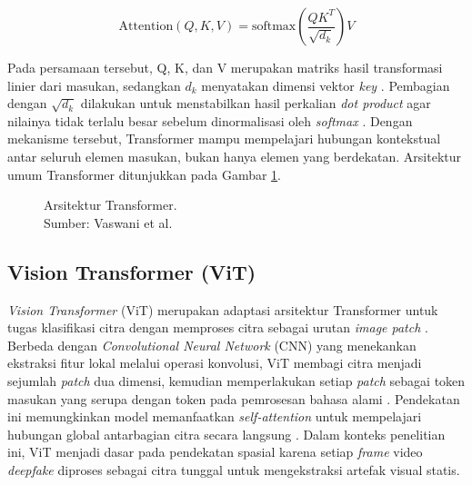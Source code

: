 \vspace{0.6\baselineskip}
\begingroup
\begin{equation}
\mathrm{Attention}(Q, K, V) = \mathrm{softmax}\left(\frac{QK^{T}}{\sqrt{d_k}}\right)V
\label{eq:self-attention}
\end{equation}
\endgroup
\vspace{0.6\baselineskip}

Pada persamaan tersebut, Q, K, dan V merupakan matriks hasil transformasi linier dari masukan, sedangkan $d_k$ menyatakan dimensi vektor \textit{key} \cite{vaswani2023attentionneed}. Pembagian dengan $\sqrt{d_k}$ dilakukan untuk menstabilkan hasil perkalian \textit{dot product} agar nilainya tidak terlalu besar sebelum dinormalisasi oleh \textit{softmax} \cite{vaswani2023attentionneed}. Dengan mekanisme tersebut, Transformer mampu mempelajari hubungan kontekstual antar seluruh elemen masukan, bukan hanya elemen yang berdekatan. Arsitektur umum Transformer ditunjukkan pada Gambar \ref{fig:arsitektur-transformer}. \par

\begin{figure}[htbp]
	\centering
	\caption{Arsitektur Transformer.\\Sumber: Vaswani et al. \cite{vaswani2023attentionneed}}
	\label{fig:arsitektur-transformer}
\end{figure}

\subsection{Vision Transformer (ViT)} \label{II.Teori5}
\textit{Vision Transformer} (ViT) merupakan adaptasi arsitektur Transformer untuk tugas klasifikasi citra dengan memproses citra sebagai urutan \textit{image patch} \cite{dosovitskiy2021imageworth16x16words}. Berbeda dengan \textit{Convolutional Neural Network} (CNN) yang menekankan ekstraksi fitur lokal melalui operasi konvolusi, ViT membagi citra menjadi sejumlah \textit{patch} dua dimensi, kemudian memperlakukan setiap \textit{patch} sebagai token masukan yang serupa dengan token pada pemrosesan bahasa alami \cite{dosovitskiy2021imageworth16x16words}. Pendekatan ini memungkinkan model memanfaatkan \textit{self-attention} untuk mempelajari hubungan global antarbagian citra secara langsung \cite{dosovitskiy2021imageworth16x16words}. Dalam konteks penelitian ini, ViT menjadi dasar pada pendekatan spasial karena setiap \textit{frame} video \textit{deepfake} diproses sebagai citra tunggal untuk mengekstraksi artefak visual statis. \par

